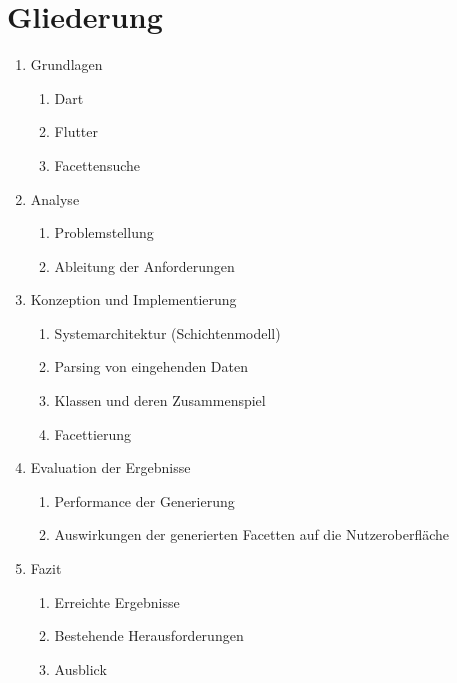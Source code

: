\section{Gliederung}
\label{sec:Einleitung:Gliederung}

\begin{enumerate}
    \item Grundlagen
        \begin{enumerate}
            \item Dart
            \item Flutter
            \item Facettensuche
        \end{enumerate}
        
    \item Analyse
    \begin{enumerate}
        \item Problemstellung
        \item Ableitung der Anforderungen
    \end{enumerate}

    \item Konzeption und Implementierung
    \begin{enumerate}
        \item Systemarchitektur (Schichtenmodell)
        \item Parsing von eingehenden Daten
        \item Klassen und deren Zusammenspiel 
        \item Facettierung
    \end{enumerate}
    
    \item Evaluation der Ergebnisse
    \begin{enumerate}
        \item Performance der Generierung
        \item Auswirkungen der generierten Facetten auf die Nutzeroberfläche
    \end{enumerate}
    
    \item Fazit
    \begin{enumerate}
        \item Erreichte Ergebnisse
        \item Bestehende Herausforderungen
        \item Ausblick
    \end{enumerate}
\end{enumerate}